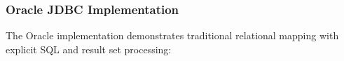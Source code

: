 \documentclass[12pt,a4paper]{article}
\begin{document}
\subsubsection{Oracle JDBC Implementation}
The Oracle implementation demonstrates traditional relational mapping with explicit SQL and result set processing:
\begin{comment}
\begin{lstlisting}[language=Java, caption=Oracle JDBC Implementation]
public class StudentDAO {
    public List<Student> getAllStudents() throws SQLException {
        List<Student> students = new ArrayList<>();
        String sql = "SELECT student_id, name, email, phone, registration_date FROM Students ORDER BY name";
        
        try (Connection conn = connectionManager.getConnection();
             PreparedStatement stmt = conn.prepareStatement(sql);
             ResultSet rs = stmt.executeQuery()) {
            
            while (rs.next()) {
                Student student = new Student();
                student.setStudentId(rs.getInt("student_id"));
                student.setName(rs.getString("name"));
                student.setEmail(rs.getString("email"));
                student.setPhone(rs.getString("phone"));
                
                Date regDate = rs.getDate("registration_date");
                if (regDate != null) {
                    student.setRegistrationDate(regDate.toLocalDate());
                }
                students.add(student);
            }
        }
        return students;
    }
    
    public void addStudent(Student student) throws SQLException {
        String sql = "INSERT INTO Students (student_id, name, email, phone, address, registration_date) VALUES (?, ?, ?, ?, ?, ?)";
        try (Connection conn = connectionManager.getConnection();
             PreparedStatement stmt = conn.prepareStatement(sql)) {
            stmt.setInt(1, student.getStudentId());
            stmt.setString(2, student.getName());
            stmt.setString(3, student.getEmail());
            stmt.setString(4, student.getPhone());
            stmt.setString(5, student.getAddress());
            stmt.setDate(6, Date.valueOf(student.getRegistrationDate()));
            stmt.executeUpdate();
        }
    }
}
\end{lstlisting}
\end{comment}
\end{document}
